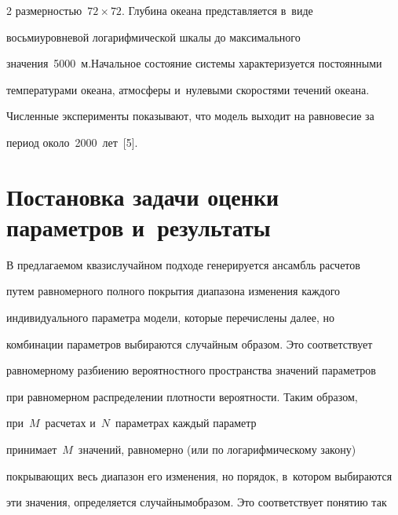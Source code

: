 \begin{multicols}{2}
размерностью~$72\times72$. Глубина океана представляется в~виде 


восьмиуровневой логарифмической шкалы до максимального 


значения~5000~м.\linebreak Начальное состояние системы характеризуется постоянными 


температурами океана, атмосферы и~нулевыми скоростями течений океана. 


Численные эксперименты показывают, что модель выходит на равновесие за 


период около~2000~лет~[5].







  


\section{Постановка задачи оценки параметров и~результаты}







  


  В предлагаемом квазислучайном подходе генерируется ансамбль расчетов 


путем равномерного полного покрытия диапазона изменения каждого 


индивидуального параметра модели, которые перечислены далее, но 


комбинации параметров выбираются случайным образом. Это соответствует 


равномерному разбиению вероятностного пространства значений параметров 


при равномерном распределении плотности вероятности. Таким образом,\linebreak 


при~$M$~расчетах и~$N$~параметрах каждый параметр 


принимает~$M$~значений, равномерно (или по логарифмическому закону) 


покрывающих весь диа\-пазон его изменения, но порядок, в~котором выбираются 


эти значения, определяется случайным\linebreak образом. Это соответствует понятию так 



\end{multicols}
